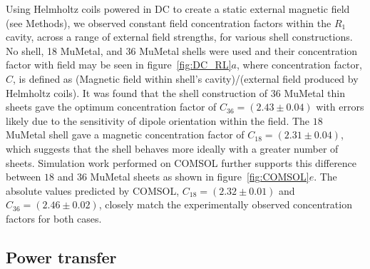 \documentclass[11pt]{iopart}
\begin{document}
Using Helmholtz coils powered in DC to create a static external
magnetic field (see Methods), we observed constant field concentration
factors within the $R_1$ cavity, across a range of external field
strengths, for various shell constructions. No shell, 18 MuMetal, and
36 MuMetal shells were used and their concentration factor with field
may be seen in figure~\ref{fig:DC_RL}$a$, where concentration factor,
$C$, is defined as (Magnetic field within shell's cavity)/(external
field produced by Helmholtz coils). It was found that the shell
construction of $36$ MuMetal thin sheets gave the optimum
concentration factor of $C_{36} = (2.43\pm0.04)$ with errors likely
due to the sensitivity of dipole orientation within the field. The
$18$ MuMetal shell gave a magnetic concentration factor of $C_{18} =
(2.31\pm0.04)$, which suggests that the shell behaves more ideally
with a greater number of sheets. Simulation work performed on COMSOL
further supports this difference between $18$ and $36$ MuMetal sheets
as shown in figure~\ref{fig:COMSOL}$e$. The absolute values predicted
by COMSOL, $C_{18}= (2.32\pm0.01)$ and $C_{36} = (2.46\pm0.02)$,
closely match the experimentally observed concentration factors for
both cases.

\subsection{Power transfer}
\end{document}
